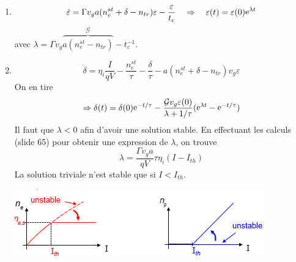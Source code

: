 	\begin{enumerate}
	\item 
	\begin{equation}
	\dot \varepsilon  = \Gamma {v_g}a(n_e^{st} + \delta  - {n_{tr}})\varepsilon  - \frac{\varepsilon }{{{t_c}}}\quad\Rightarrow\quad \varepsilon (t) = \varepsilon (0){{\mathop{\rm e}\nolimits} ^{\lambda t}}
	\end{equation}
	avec $\lambda  = \Gamma {v_g}\overbrace{a(n_e^{st} - {n_{tr}})}^{\mathcal{G}} - t_c^{ - 1}$.
	\item 
	\begin{equation}
	\dot \delta  = {\eta _i}\frac{{I}}{{qV}} - \frac{{n_e^{st}}}{\tau } - \frac{\delta }{\tau } -
	 a(n_e^{st} + \delta  - {n_{tr}}){v_g}\varepsilon 
	\end{equation}
	On en tire
	\begin{equation}
	 \Rightarrow \delta (t) = \delta (0){{\mathop{\rm e}\nolimits} ^{ - t/\tau }} - \frac{{{{\cal G}}{v_g}\varepsilon (0)}}{{\lambda  + 1/\tau }}({{\mathop{\rm e}\nolimits} ^{\lambda t}} - {{\mathop{\rm e}\nolimits} ^{ - t/\tau }})
	\end{equation}
	Il faut que $\lambda < 0$ afin d'avoir une solution stable. En effectuant les calculs (slide 65)
	pour obtenir une expression de $\lambda$, on trouve 
	\begin{equation}
	\lambda  = \frac{{\Gamma {v_g}a}}{{qV}}\tau {\eta _i}({I} - {{I}_{th}})
	\end{equation}
	La solution triviale n'est stable que si $I < I_{th}$.
	\begin{center}
	\includegraphics[scale=0.75]{ch5/image50}
	\end{center}
	\end{enumerate}	
	
	
